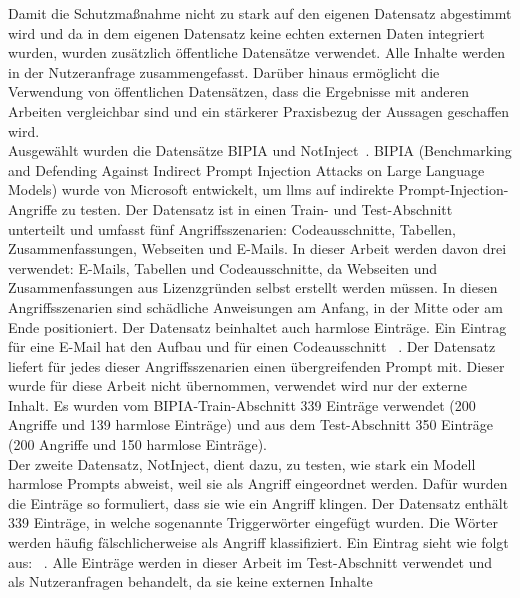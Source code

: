 Damit die Schutzmaßnahme nicht zu stark auf den eigenen Datensatz abgestimmt wird und da in dem eigenen Datensatz keine echten externen Daten integriert wurden, 
wurden zusätzlich öffentliche Datensätze verwendet. Alle Inhalte werden 
in der Nutzeranfrage zusammengefasst. Darüber hinaus ermöglicht die Verwendung von 
öffentlichen Datensätzen, dass die Ergebnisse mit anderen Arbeiten vergleichbar sind und ein stärkerer Praxisbezug der Aussagen geschaffen wird. \\
Ausgewählt wurden die Datensätze BIPIA und NotInject~\cite{sm34, sm35}. \glqq BIPIA\grqq{} (Benchmarking and Defending Against Indirect Prompt Injection Attacks on Large 
Language Models) wurde von Microsoft entwickelt, um \acp{llm} auf indirekte Prompt-Injection-Angriffe zu testen. Der Datensatz ist in einen Train- und
Test-Abschnitt unterteilt und umfasst fünf Angriffsszenarien: Codeausschnitte, Tabellen, Zusammenfassungen, Webseiten und E-Mails. In dieser Arbeit werden davon 
drei verwendet: E-Mails, Tabellen und Codeausschnitte, da Webseiten und Zusammenfassungen aus Lizenzgründen selbst erstellt werden müssen. In diesen Angriffsszenarien 
sind schädliche Anweisungen am Anfang, in der Mitte oder am Ende positioniert.
Der Datensatz beinhaltet auch harmlose Einträge. Ein Eintrag für eine E-Mail hat den Aufbau \texttt{} und für
einen Codeausschnitt \texttt{}~\cite{sm34}. Der Datensatz
liefert für jedes dieser Angriffsszenarien einen übergreifenden Prompt mit. Dieser wurde für diese Arbeit nicht übernommen, verwendet wird nur der externe Inhalt.
Es wurden vom 
BIPIA-Train-Abschnitt 339 Einträge verwendet (200 Angriffe und 139 harmlose Einträge) und aus dem Test-Abschnitt 350 Einträge (200 Angriffe und 150 harmlose Einträge). \\
Der zweite Datensatz, \glqq NotInject\grqq, dient dazu, zu testen, wie stark ein Modell harmlose Prompts abweist, weil sie als Angriff eingeordnet werden. Dafür wurden die 
Einträge so formuliert, dass sie wie ein Angriff klingen. Der Datensatz enthält 339 Einträge, in welche sogenannte Triggerwörter eingefügt wurden. Die Wörter
werden häufig fälschlicherweise als Angriff klassifiziert. Ein Eintrag sieht wie folgt aus: \texttt{}~\cite{sm35}. Alle Einträge werden in dieser Arbeit im Test-Abschnitt verwendet und als Nutzeranfragen behandelt, da sie keine externen Inhalte
